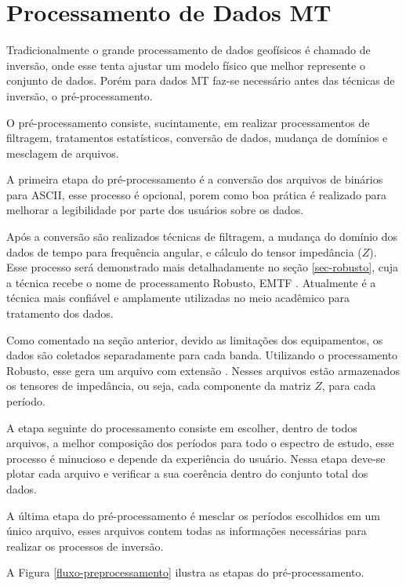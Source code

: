     \section{Processamento de Dados MT}
        Tradicionalmente o grande processamento de dados geofísicos é chamado de inversão, onde esse tenta ajustar um modelo físico que melhor represente o conjunto de dados. Porém para dados MT faz-se necessário antes das técnicas de inversão, o pré-processamento.
        
        O pré-processamento consiste, sucintamente, em realizar processamentos de filtragem, tratamentos estatísticos, conversão de dados, mudança de domínios e mesclagem de arquivos.
    
        A primeira etapa do pré-processamento é a conversão dos arquivos de binários para ASCII, esse processo é opcional, porem como boa prática é realizado para melhorar a legibilidade por parte dos usuários sobre os dados.
        
        Após a conversão são realizados técnicas de filtragem, a mudança do domínio dos dados de tempo para frequência angular, e cálculo do tensor impedância ($Z$). Esse processo será demonstrado mais detalhadamente no seção \ref{sec-robusto}, cuja a técnica recebe o nome de processamento Robusto, EMTF \cite{robusto-egbert}. Atualmente é a técnica mais confiável e amplamente utilizadas no meio acadêmico para tratamento dos dados.
        
        Como comentado na seção anterior, devido as limitações dos equipamentos, os dados são coletados separadamente para cada banda. Utilizando o processamento Robusto, esse gera um arquivo com extensão . Nesses arquivos estão armazenados os tensores de impedância, ou seja, cada componente da matriz $Z$, para cada período.
        
        A etapa seguinte do processamento consiste em escolher, dentro de todos arquivos, a melhor composição dos períodos para todo o espectro de estudo, esse processo é minucioso e depende da experiência do usuário. Nessa etapa deve-se plotar cada arquivo e verificar a sua coerência dentro do conjunto total dos dados.
        
        A última etapa do pré-processamento é mesclar os períodos escolhidos em um único arquivo, esses arquivos contem todas as informações necessárias para realizar os processos de inversão.
        
        A Figura \ref{fluxo-preprocessamento} ilustra as etapas do pré-processamento.
        
